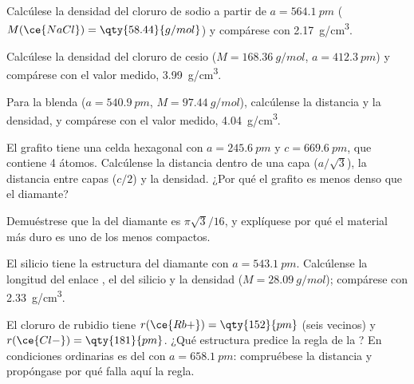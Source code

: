 \begin{exercise}[$\star\star$]\label{exo:b1:crystals-ionic-covalent:6}
Calcúlese la densidad del cloruro de sodio a partir de
$a = \qty{564.1}{pm}$ ($M(\ce{NaCl}) = \qty{58.44}{g/mol}$) y compárese
con \qty{2.17}{g/cm^3}.
\end{exercise}

\begin{exercise}[$\star\star$]\label{exo:b1:crystals-ionic-covalent:7}
Calcúlese la densidad del cloruro de cesio ($M = \qty{168.36}{g/mol}$,
$a = \qty{412.3}{pm}$) y compárese con el valor medido,
\qty{3.99}{g/cm^3}.
\end{exercise}

\begin{exercise}[$\star\star$]\label{exo:b1:crystals-ionic-covalent:8}
Para la blenda ($a = \qty{540.9}{pm}$, $M = \qty{97.44}{g/mol}$),
calcúlense la distancia  y la densidad, y compárese con el valor
medido, \qty{4.04}{g/cm^3}.
\end{exercise}

\begin{exercise}[$\star\star$]\label{exo:b1:crystals-ionic-covalent:9}
El grafito tiene una celda hexagonal con $a = \qty{245.6}{pm}$ y
$c = \qty{669.6}{pm}$, que contiene 4 átomos. Calcúlense la distancia
 dentro de una capa ($a/\sqrt3$), la distancia entre capas
($c/2$) y la densidad. ¿Por qué el grafito es menos denso que el
diamante?
\end{exercise}

\begin{exercise}[$\star\star\star$]\label{exo:b1:crystals-ionic-covalent:10}
Demuéstrese que la  del diamante es $\pi\sqrt3/16$, y
explíquese por qué el material más duro es uno de los menos compactos.
\end{exercise}

\begin{exercise}[$\star\star\star$]\label{exo:b1:crystals-ionic-covalent:11}
El silicio tiene la estructura del diamante con $a = \qty{543.1}{pm}$.
Calcúlense la longitud del enlace , el  del
silicio y la densidad ($M = \qty{28.09}{g/mol}$); compárese con
\qty{2.33}{g/cm^3}.
\end{exercise}

\begin{exercise}[$\star\star\star$]\label{exo:b1:crystals-ionic-covalent:12}
El cloruro de rubidio tiene $r(\ce{Rb+}) = \qty{152}{pm}$ (seis vecinos)
y $r(\ce{Cl-}) = \qty{181}{pm}$. ¿Qué estructura predice la regla de la
? En condiciones ordinarias es del  con
$a = \qty{658.1}{pm}$: compruébese la distancia  y propóngase
por qué falla aquí la regla.
\end{exercise}

